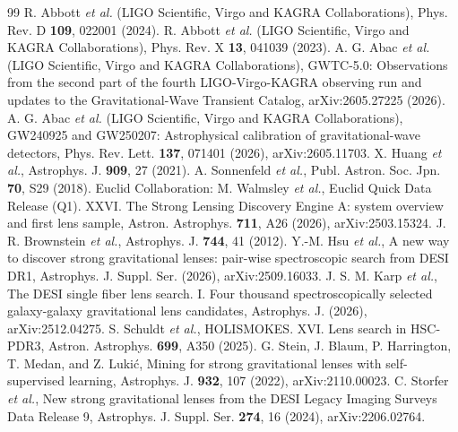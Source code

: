 \begin{thebibliography}{99}
R. Abbott \textit{et al.} (LIGO Scientific, Virgo and KAGRA Collaborations), Phys. Rev. D \textbf{109}, 022001 (2024).
R. Abbott \textit{et al.} (LIGO Scientific, Virgo and KAGRA Collaborations), Phys. Rev. X \textbf{13}, 041039 (2023).
A. G. Abac \textit{et al.} (LIGO Scientific, Virgo and KAGRA Collaborations), GWTC-5.0: Observations from the second part of the fourth LIGO-Virgo-KAGRA observing run and updates to the Gravitational-Wave Transient Catalog, arXiv:2605.27225 (2026).
A. G. Abac \textit{et al.} (LIGO Scientific, Virgo and KAGRA Collaborations), GW240925 and GW250207: Astrophysical calibration of gravitational-wave detectors, Phys. Rev. Lett. \textbf{137}, 071401 (2026), arXiv:2605.11703.
X. Huang \textit{et al.}, Astrophys. J. \textbf{909}, 27 (2021).
A. Sonnenfeld \textit{et al.}, Publ. Astron. Soc. Jpn. \textbf{70}, S29 (2018).
Euclid Collaboration: M. Walmsley \textit{et al.}, Euclid Quick Data Release (Q1). XXVI. The Strong Lensing Discovery Engine A: system overview and first lens sample, Astron. Astrophys. \textbf{711}, A26 (2026), arXiv:2503.15324.
J. R. Brownstein \textit{et al.}, Astrophys. J. \textbf{744}, 41 (2012).
Y.-M. Hsu \textit{et al.}, A new way to discover strong gravitational lenses: pair-wise spectroscopic search from DESI DR1, Astrophys. J. Suppl. Ser. (2026), arXiv:2509.16033.
J. S. M. Karp \textit{et al.}, The DESI single fiber lens search. I. Four thousand spectroscopically selected galaxy-galaxy gravitational lens candidates, Astrophys. J. (2026), arXiv:2512.04275.
S. Schuldt \textit{et al.}, HOLISMOKES. XVI. Lens search in HSC-PDR3, Astron. Astrophys. \textbf{699}, A350 (2025).
G. Stein, J. Blaum, P. Harrington, T. Medan, and Z. Luki\'c, Mining for strong gravitational lenses with self-supervised learning, Astrophys. J. \textbf{932}, 107 (2022), arXiv:2110.00023.
C. Storfer \textit{et al.}, New strong gravitational lenses from the DESI Legacy Imaging Surveys Data Release 9, Astrophys. J. Suppl. Ser. \textbf{274}, 16 (2024), arXiv:2206.02764.

\end{thebibliography}
